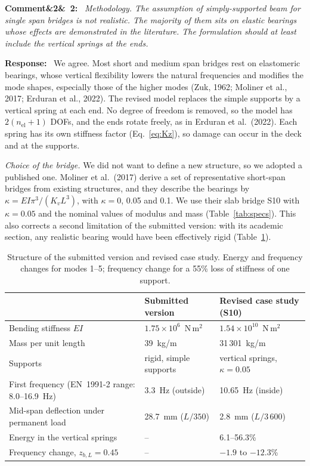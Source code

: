 \documentclass[11pt]{article}
\newenvironment{rcomment}[1]{\par\bigskip\noindent\textbf{Comment\ifx&#1&\else\ #1\fi:}\ \itshape}{\par}
\newenvironment{response}{\par\smallskip\noindent\color{resp}\textbf{Response:}\ }{\par}
\begin{document}
\begin{rcomment}{2}
Methodology. The assumption of simply-supported beam for single span bridges is not realistic. The majority of them
sits on elastic bearings whose effects are demonstrated in the literature. The formulation should at least include the
vertical springs at the ends.
\end{rcomment}

\begin{response}
We agree. Most short and medium span bridges rest on elastomeric bearings, whose vertical flexibility lowers the natural
frequencies and modifies the mode shapes, especially those of the higher modes (Zuk, 1962; Moliner et al., 2017; Erduran et al.,
2022). The revised model replaces the simple supports by a vertical spring at each end. No degree of freedom is removed, so the
model has $2(n_{\mathrm{el}}+1)$ DOFs, and the ends rotate freely, as in Erduran et al.\ (2022). Each spring has its own stiffness
factor (Eq.~\eqref{eq:Kz}), so damage can occur in the deck and at the supports.

\textit{Choice of the bridge.} We did not want to define a new structure, so we adopted a published one. Moliner et al.\ (2017)
derive a set of representative short-span bridges from existing structures, and they describe the bearings by
$\kappa=EI\pi^3/(K_vL^3)$, with $\kappa=0$, 0.05 and 0.1. We use their slab bridge S10 with $\kappa=0.05$ and the nominal values of
modulus and mass (Table~\ref{tab:specs}). This also corrects a second limitation of the submitted version: with its academic
section, any realistic bearing would have been effectively rigid (Table~\ref{tab:old_new}).

\begin{table}[H]
\centering\small
\caption{Structure of the submitted version and revised case study. Energy and frequency changes for modes 1--5; frequency change
for a 55\% loss of stiffness of one support.}
\label{tab:old_new}
\footnotesize
\begin{tabular}{p{5.6cm}p{3.9cm}p{5.1cm}}
\toprule
 & Submitted version & Revised case study (S10) \\
\midrule
Bending stiffness $EI$ & $1.75\times10^{6}$~N\,m$^2$ & $1.54\times10^{10}$~N\,m$^2$ \\
Mass per unit length & 39~kg/m & 31\,301~kg/m \\
Supports & rigid, simple supports & vertical springs, $\kappa=0.05$ \\
First frequency (EN~1991-2 range: 8.0--16.9~Hz) & 3.3~Hz (outside) & 10.65~Hz (inside) \\
Mid-span deflection under permanent load & 28.7~mm ($L/350$) & 2.8~mm ($L/3\,600$) \\
Energy in the vertical springs & -- & 6.1--56.3\% \\
Frequency change, $z_{b,L}=0.45$ & -- & $-1.9$ to $-12.3$\% \\
\bottomrule
\end{tabular}
\end{table}


\end{response}
\end{document}
